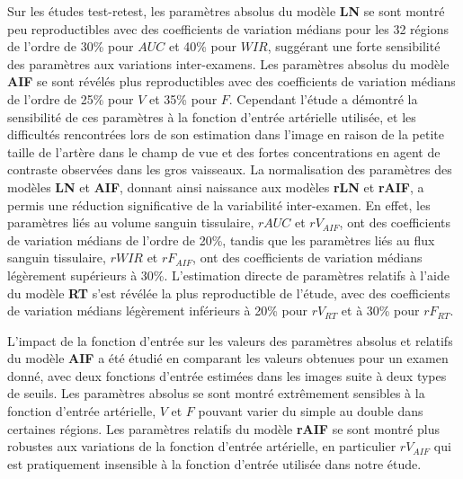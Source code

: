 \begin{otherlanguage}{francais}
Sur les \'etudes test-retest, les param\`etres absolus du mod\`ele \textbf{LN} se sont montr\'e peu reproductibles avec des coefficients de variation m\'edians pour les 32 r\'egions de l'ordre de 30\% pour $AUC$ et 40\% pour $WIR$, sugg\'erant une forte sensibilit\'e des param\`etres aux variations inter-examens.
Les param\`etres absolus du mod\`ele \textbf{AIF} se sont r\'ev\'el\'es plus reproductibles avec des coefficients de variation m\'edians de l'ordre de 25\% pour $V$ et 35\% pour $F$.
Cependant l'\'etude a d\'emontr\'e la sensibilit\'e de ces param\`etres \`a la fonction d'entr\'ee art\'erielle utilis\'ee, et les difficult\'es rencontr\'ees lors de son estimation dans l'image en raison de la petite taille de l'art\`ere dans le champ de vue et des fortes concentrations en agent de contraste observ\'ees dans les gros vaisseaux.
La normalisation des param\`etres des mod\`eles \textbf{LN} et \textbf{AIF}, donnant ainsi naissance aux mod\`eles \textbf{rLN} et \textbf{rAIF}, a permis une r\'eduction significative de la variabilit\'e inter-examen.
En effet, les param\`etres li\'es au volume sanguin tissulaire, $rAUC$ et $rV_{AIF}$, ont des coefficients de variation m\'edians de l'ordre de 20\%, tandis que les param\`etres li\'es au flux sanguin tissulaire, $rWIR$ et $rF_{AIF}$, ont des coefficients de variation m\'edians l\'eg\`erement sup\'erieurs \`a 30\%.
L'estimation directe de param\`etres relatifs \`a l'aide du mod\`ele \textbf{RT} s'est r\'ev\'el\'ee la plus reproductible de l'\'etude, avec des coefficients de variation m\'edians l\'eg\`erement inf\'erieurs \`a 20\% pour $rV_{RT}$ et \`a 30\% pour $rF_{RT}$.

L'impact de la fonction d'entr\'ee sur les valeurs des param\`etres absolus et relatifs du mod\`ele \textbf{AIF} a \'et\'e \'etudi\'e en comparant les valeurs obtenues pour un examen donn\'e, avec deux fonctions d'entr\'ee estim\'ees dans les images suite \`a deux types de seuils.
Les param\`etres absolus se sont montr\'e extr\^emement sensibles \`a la fonction d'entr\'ee art\'erielle, $V$ et $F$ pouvant varier du simple au double dans certaines r\'egions.
Les param\`etres relatifs du mod\`ele \textbf{rAIF} se sont montr\'e plus robustes aux variations de la fonction d'entr\'ee art\'erielle, en particulier $rV_{AIF}$ qui est pratiquement insensible \`a la fonction d'entr\'ee utilis\'ee dans notre \'etude.


\end{otherlanguage}
